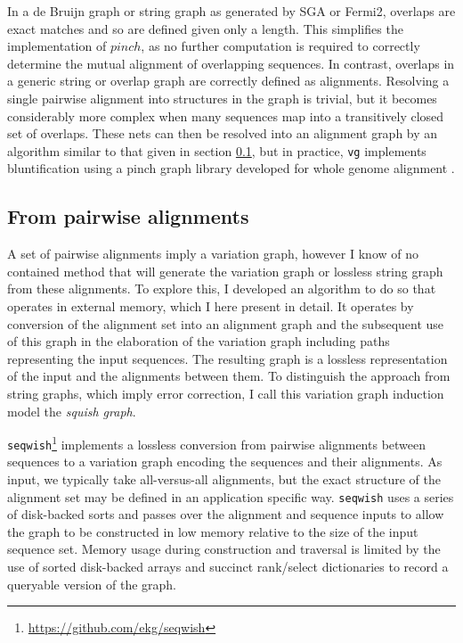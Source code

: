In a de Bruijn graph or string graph as generated by SGA or Fermi2, overlaps are exact matches and so are defined given only a length.
This simplifies the implementation of $pinch$, as no further computation is required to correctly determine the mutual alignment of overlapping sequences.
In contrast, overlaps in a generic string or overlap graph are correctly defined as alignments.
Resolving a single pairwise alignment into structures in the graph is trivial, but it becomes considerably more complex when many sequences map into a transitively closed set of overlaps.
These nets can then be resolved into an alignment graph by an algorithm similar to that given in section \ref{sec:from_pairwise_alignments}, but in practice, {\tt vg} implements bluntification using a pinch graph library developed for whole genome alignment \cite{Paten:2011fva}.

\subsection{From pairwise alignments}
\label{sec:from_pairwise_alignments}

A set of pairwise alignments imply a variation graph, however I know of no contained method that will generate the variation graph or lossless string graph from these alignments.
To explore this, I developed an algorithm to do so that operates in external memory, which I here present in detail.
It operates by conversion of the alignment set into an alignment graph and the subsequent use of this graph in the elaboration of the variation graph including paths representing the input sequences.
The resulting graph is a lossless representation of the input and the alignments between them.
To distinguish the approach from string graphs, which imply error correction, I call this variation graph induction model the \emph{squish graph}.

{\tt seqwish}\footnote{\url{https://github.com/ekg/seqwish}} implements a lossless conversion from pairwise alignments between sequences to a variation graph encoding the sequences and their alignments.
As input, we typically take all-versus-all alignments, but the exact structure of the alignment set may be defined in an application specific way.
{\tt seqwish} uses a series of disk-backed sorts and passes over the alignment and sequence inputs to allow the graph to be constructed in low memory relative to the size of the input sequence set.
Memory usage during construction and traversal is limited by the use of sorted disk-backed arrays and succinct rank/select dictionaries to record a queryable version of the graph.

